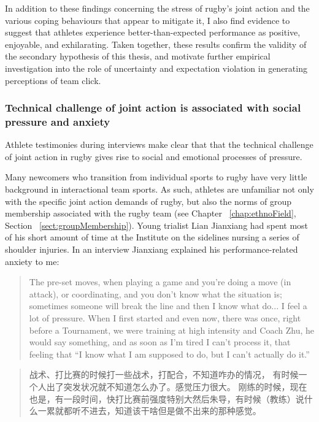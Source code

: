 \begin{CJK}{UTF8}{gbsn}
In addition to these findings concerning the stress of rugby's joint action and the various coping behaviours that appear to mitigate it, I also find evidence to suggest that athletes experience better-than-expected performance as positive, enjoyable, and exhilarating.  Taken together, these results confirm the validity of the secondary hypothesis of this thesis, and motivate further empirical investigation into the role of uncertainty and expectation violation in generating perceptions of team click.


\subsubsection{Technical challenge of joint action is associated with social pressure and anxiety}

Athlete testimonies during interviews make clear that that the technical challenge of joint action in rugby gives rise to social and emotional processes of pressure.

Many newcomers who transition from individual sports to rugby have very little background in interactional team sports.  As such, athletes are unfamiliar not only with the specific joint action demands of rugby, but also the norms of group membership associated with the rugby team (see Chapter ~\ref{chap:ethnoField}, Section ~\ref{sect:groupMembership}).  Young trialist Lian Jianxiang had spent most of his short amount of time at the Institute on the sidelines nursing a series of shoulder injuries. In an interview Jianxiang explained his performance-related anxiety to me:

    \begin{quote}
      The pre-set moves, when playing a game and you’re doing a move (in attack), or coordinating, and you don’t know what the situation is; sometimes someone will break the line and then I know what do... I feel a lot of pressure.  When I first started and even now, there was once, right before a Tournament, we were training at high intensity and Coach Zhu, he would say something, and as soon as I'm tired I can't process it, that feeling that ``I know what I am supposed to do, but I can't actually do it.''
    \end{quote}

    \begin{quote}
      战术、打比赛的时候打一些战术，打配合，不知道咋办的情况， 有时候一个人出了突发状况就不知道怎么办了。感觉压力很大。 刚练的时候，现在也是，有一段时间，快打比赛前强度特别大然后朱导，有时候（教练）说什么一累就都听不进去，知道该干啥但是做不出来的那种感觉。
    \end{quote}


\end{CJK}
